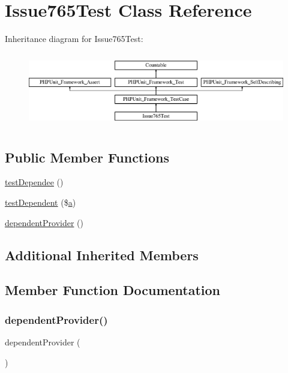 \hypertarget{class_issue765_test}{}\section{Issue765\+Test Class Reference}
\label{class_issue765_test}
Inheritance diagram for Issue765\+Test\+:\begin{figure}[H]
\begin{center}
\leavevmode
\includegraphics[height=3.303835cm]{class_issue765_test}
\end{center}
\end{figure}
\subsection*{Public Member Functions}
\begin{DoxyCompactItemize}
\item 
\mbox{\hyperlink{class_issue765_test_a6e472ccc3253d4805e6a9d48be1ea3cc}{test\+Dependee}} ()
\item 
\mbox{\hyperlink{class_issue765_test_af7619f4724aaab5bc645635d8a9bcf36}{test\+Dependent}} (\$\mbox{\hyperlink{interfacea}{a}})
\item 
\mbox{\hyperlink{class_issue765_test_a182125345f740caa8af02e3d77e3493a}{dependent\+Provider}} ()
\end{DoxyCompactItemize}
\subsection*{Additional Inherited Members}


\subsection{Member Function Documentation}
\mbox{\label{class_issue765_test_a182125345f740caa8af02e3d77e3493a}} 
\subsubsection{\texorpdfstring{dependent\+Provider()}{dependentProvider()}}
{\footnotesize\ttfamily dependent\+Provider (\begin{DoxyParamCaption}{ }\end{DoxyParamCaption})}

